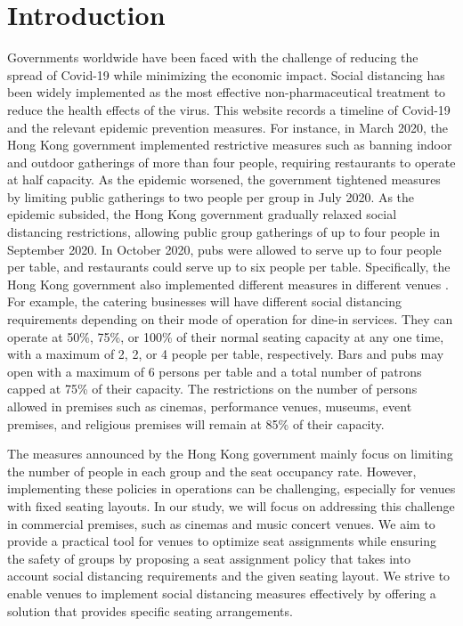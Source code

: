 \section{Introduction}
Governments worldwide have been faced with the challenge of reducing the spread of Covid-19 while minimizing the economic impact. Social distancing has been widely implemented as the most effective non-pharmaceutical treatment to reduce the health effects of the virus. 
This website records a timeline of Covid-19 and the relevant epidemic prevention measures\cite{Covid19Timeline}. For instance, in March 2020, the Hong Kong government implemented restrictive measures such as banning indoor and outdoor gatherings of more than four people, requiring restaurants to operate at half capacity. As the epidemic worsened, the government tightened measures by limiting public gatherings to two people per group in July 2020. As the epidemic subsided, the Hong Kong government gradually relaxed social distancing restrictions, allowing public group gatherings of up to four people in September 2020. In October 2020, pubs were allowed to serve up to four people per table, and restaurants could serve up to six people per table. Specifically, the Hong Kong government also implemented different measures in different venues \cite{Gov202209}. For example, the catering businesses will have different social distancing requirements depending on their mode of operation for dine-in services. They can operate at 50\%, 75\%, or 100\% of their normal seating capacity at any one time, with a maximum of 2, 2, or 4 people per table, respectively. Bars and pubs may open with a maximum of 6 persons per table and a total number of patrons capped at 75\% of their capacity. The restrictions on the number of persons allowed in premises such as cinemas, performance venues, museums, event premises, and religious premises will remain at 85\% of their capacity.

The measures announced by the Hong Kong government mainly focus on limiting the number of people in each group and the seat occupancy rate. However, implementing these policies in operations can be challenging, especially for venues with fixed seating layouts. In our study, we will focus on addressing this challenge in commercial premises, such as cinemas and music concert venues. We aim to provide a practical tool for venues to optimize seat assignments while ensuring the safety of groups by proposing a seat assignment policy that takes into account social distancing requirements and the given seating layout. We strive to enable venues to implement social distancing measures effectively by offering a solution that provides specific seating arrangements.

